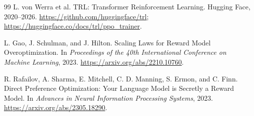\documentclass[11pt]{article}
\begin{document}
\begin{thebibliography}{99}
L. von Werra et al.
\newblock TRL: Transformer Reinforcement Learning.
\newblock Hugging Face, 2020--2026.
\newblock \url{https://github.com/huggingface/trl};
\url{https://huggingface.co/docs/trl/ppo_trainer}.

L. Gao, J. Schulman, and J. Hilton.
\newblock Scaling Laws for Reward Model Overoptimization.
\newblock In \emph{Proceedings of the 40th International Conference on Machine
Learning}, 2023.
\newblock \url{https://arxiv.org/abs/2210.10760}.

R. Rafailov, A. Sharma, E. Mitchell, C. D. Manning, S. Ermon, and C. Finn.
\newblock Direct Preference Optimization: Your Language Model is Secretly a
Reward Model.
\newblock In \emph{Advances in Neural Information Processing Systems}, 2023.
\newblock \url{https://arxiv.org/abs/2305.18290}.

\end{thebibliography}
\end{document}
